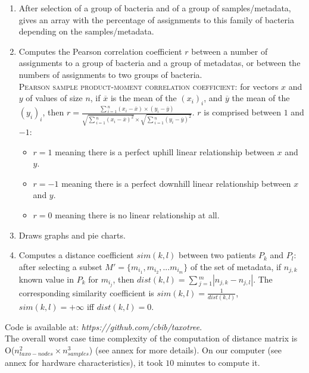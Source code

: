 \documentclass{report}
\begin{document}
\begin{enumerate}
\item After selection of a group of bacteria and of a group of samples/metadata, gives an array with the percentage of assignments to this family of bacteria depending on the samples/metadata.
\item Computes the Pearson correlation coefficient $r$ between a number of assignments to a group of bacteria and a group of metadatas, or between the numbers of assignments to two groups of bacteria. \\

\textsc{Pearson sample product-moment correlation coefficient:} \cite{Pearson} for vectors $x$ and $y$ of values of size $n$, if $\overline{x}$ is the mean of the $(x_{i})_{i}$, and $\overline{y}$ the mean of the $(y_{i})_{i}$, then $r = \frac{\sum{_{i = 1}^{n}}{(x_{i} - \overline{x}) \times (y_{i} - \overline{y})}}{\sqrt{\sum{_{i = 1}^{n}}{(x_{i} - \overline{x})^{2}}} \times \sqrt{\sum{_{i = 1}^{n}}{(y_{i} - \overline{y})^{2}}}}$. $r$ is comprised between $1$ and $-1$:
\begin{itemize} 
\item $r = 1$ meaning there is a perfect uphill linear relationship between $x$ and $y$.
\item $r = -1$ meaning there is a perfect downhill linear relationship between $x$ and $y$.
\item $r = 0$ meaning there is no linear relationship at all.
\end{itemize}

\item Draws graphs and pie charts.
\item Computes a distance coefficient $sim(k,l)$ between two patients $P_{k}$ and $P_{l}$: after selecting a subset $M' = \{ m_{i_{1}}, m_{i_{2}}, ... m_{i_{m}}\}$ of the set of metadata, if $n_{j,k}$ known value in $P_{k}$ for $m_{i_{j}}$, then $dist(k,l) = \sum{_{j = 1}^{m}}{|n_{j,k} - n_{j,l}|}$. The corresponding similarity coefficient is $sim(k,l) = \frac{1}{dist(k,l)}$, $sim(k,l) = +\infty$ iff $dist(k,l) = 0$.
\end{enumerate}

Code is available at: \emph{https://github.com/cbib/taxotree}.\\

The overall worst case time complexity of the computation of distance matrix is O($n_{taxo-nodes}^{2} \times n_{samples}^{3}$) (see annex for more details). On our computer (see annex for hardware characteristics), it took $10$ minutes to compute it.
\end{document}
